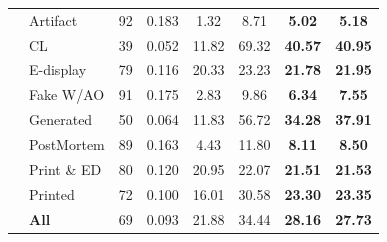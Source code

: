 \begin{table}[!htbp]
\begin{tabular}{l l c c c c c c}
& Artifact       & 92 & 0.183 &   1.32 &   8.71 &        \textbf{5.02} &  \textbf{5.18} \\
& CL             & 39 & 0.052 &  11.82 &  69.32 &       \textbf{40.57} & \textbf{40.95} \\
& E-display      & 79 & 0.116 &  20.33 &  23.23 &       \textbf{21.78} & \textbf{21.95} \\
& Fake W/AO      & 91 & 0.175 &   2.83 &   9.86 &        \textbf{6.34} &  \textbf{7.55} \\
& Generated      & 50 & 0.064 &  11.83 &  56.72 &       \textbf{34.28} & \textbf{37.91} \\
& PostMortem     & 89 & 0.163 &   4.43 &  11.80 &        \textbf{8.11} &  \textbf{8.50} \\
& Print \& ED    & 80 & 0.120 &  20.95 &  22.07 &       \textbf{21.51} & \textbf{21.53} \\
& Printed        & 72 & 0.100 &  16.01 &  30.58 &       \textbf{23.30} & \textbf{23.35} \\
& \textbf{All}  & 69 & 0.093 &  21.88 &  34.44 &       \textbf{28.16} & \textbf{27.73} \\

\bottomrule
\end{tabular}
\end{table}